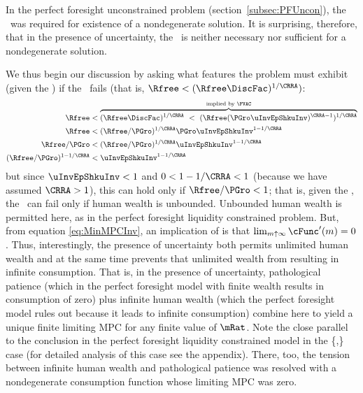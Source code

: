 \documentclass[BufferStockTheory]{subfiles}
\begin{document}
In the perfect foresight unconstrained problem
(section~\ref{subsec:PFUncon}), the \RIC~was required for existence of
a nondegenerate solution.  It is surprising, therefore, that in the
presence of uncertainty, the \RIC~is neither necessary nor sufficient
for a nondegenerate solution.

We thus begin our discussion by asking what features the problem must
exhibit (given the \FVAC) if the \RIC~fails (that is, $\Rfree < (\Rfree \DiscFac)^{1/\CRRA})$:
\begin{align}
  \Rfree   & < \overbrace{(\Rfree \DiscFac)^{1/\CRRA} ~ < ~ (\Rfree (\PGro \uInvEpShkuInv)^{\CRRA-1})^{1/\CRRA}}^{\text{implied by \FVAC}} \notag
  \\  \Rfree   & < (\Rfree/\PGro)^{1/\CRRA}\PGro \uInvEpShkuInv^{1-1/\CRRA} \notag
  \\  \Rfree/\PGro  & < (\Rfree/\PGro)^{1/\CRRA}\uInvEpShkuInv^{1-1/\CRRA} \notag
  \\  (\Rfree/\PGro)^{1-1/\CRRA}  & < \uInvEpShkuInv^{1-1/\CRRA} \label{eq:RICimplies}
\end{align}
but since $\uInvEpShkuInv<1$ and $0 < 1-1/\CRRA < 1$ (because we have
assumed $\CRRA > 1$), this can hold only if $\Rfree/\PGro < 1$; that
is, given the \FVAC, the \RIC~can fail only if human wealth is
unbounded.  Unbounded human wealth is permitted here, as in the
perfect foresight liquidity constrained problem.  But,
from  equation
\eqref{eq:MinMPCInv}, an implication of \cncl{\RIC} is that $\lim_{m
  \uparrow \infty} \cFunc^{\prime}(m) = 0$.  Thus, interestingly,
the presence of uncertainty both permits unlimited human wealth and at
the same time prevents that unlimited wealth from resulting in
infinite consumption.  That is, in the presence of uncertainty,
pathological patience (which in the perfect foresight model with
finite wealth results in consumption of zero) plus infinite human
wealth (which the perfect foresight model rules out because it leads
to infinite consumption) combine here to yield a unique finite
limiting MPC for any finite value of $\mRat$.  Note
the close parallel to the conclusion in the perfect foresight
liquidity constrained model in the
\{\PFGIC,\cncl{\RIC}\} case (for detailed analysis of this
case see the appendix).  There, too, the tension between infinite human wealth
and pathological patience was resolved with a nondegenerate consumption function
whose limiting MPC was zero.
\end{document}
